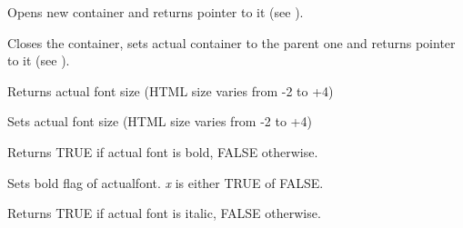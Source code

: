 \label{wxhtmlwinparseropencontainer}


Opens new container and returns pointer to it (see ).

%
%
%
%

\label{wxhtmlwinparserclosecontainer}


Closes the container, sets actual container to the parent one
and returns pointer to it (see ).



\label{wxhtmlwinparsergetfontsize}


Returns actual font size (HTML size varies from -2 to +4)

\label{wxhtmlwinparsersetfontsize}


Sets actual font size (HTML size varies from -2 to +4)

\label{wxhtmlwinparsergetfontbold}


Returns TRUE if actual font is bold, FALSE otherwise.

\label{wxhtmlwinparsersetfontbold}


Sets bold flag of actualfont. {\it x} is either TRUE of FALSE.

\label{wxhtmlwinparsergetfontitalic}


Returns TRUE if actual font is italic, FALSE otherwise.


\label{wxhtmlwinparsersetfontitalic}

